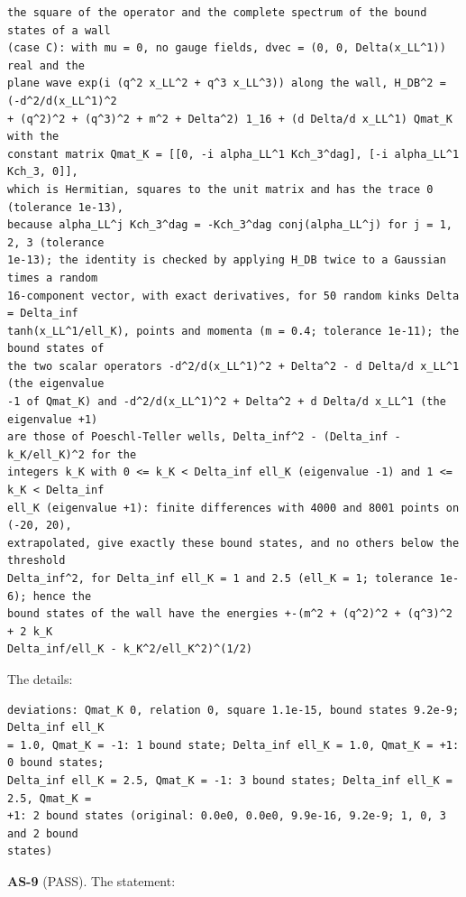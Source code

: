\documentclass[
  10pt,
]{article}
\begin{document}
\begin{verbatim}
the square of the operator and the complete spectrum of the bound states of a wall
(case C): with mu = 0, no gauge fields, dvec = (0, 0, Delta(x_LL^1)) real and the
plane wave exp(i (q^2 x_LL^2 + q^3 x_LL^3)) along the wall, H_DB^2 = (-d^2/d(x_LL^1)^2
+ (q^2)^2 + (q^3)^2 + m^2 + Delta^2) 1_16 + (d Delta/d x_LL^1) Qmat_K with the
constant matrix Qmat_K = [[0, -i alpha_LL^1 Kch_3^dag], [-i alpha_LL^1 Kch_3, 0]],
which is Hermitian, squares to the unit matrix and has the trace 0 (tolerance 1e-13),
because alpha_LL^j Kch_3^dag = -Kch_3^dag conj(alpha_LL^j) for j = 1, 2, 3 (tolerance
1e-13); the identity is checked by applying H_DB twice to a Gaussian times a random
16-component vector, with exact derivatives, for 50 random kinks Delta = Delta_inf
tanh(x_LL^1/ell_K), points and momenta (m = 0.4; tolerance 1e-11); the bound states of
the two scalar operators -d^2/d(x_LL^1)^2 + Delta^2 - d Delta/d x_LL^1 (the eigenvalue
-1 of Qmat_K) and -d^2/d(x_LL^1)^2 + Delta^2 + d Delta/d x_LL^1 (the eigenvalue +1)
are those of Poeschl-Teller wells, Delta_inf^2 - (Delta_inf - k_K/ell_K)^2 for the
integers k_K with 0 <= k_K < Delta_inf ell_K (eigenvalue -1) and 1 <= k_K < Delta_inf
ell_K (eigenvalue +1): finite differences with 4000 and 8001 points on (-20, 20),
extrapolated, give exactly these bound states, and no others below the threshold
Delta_inf^2, for Delta_inf ell_K = 1 and 2.5 (ell_K = 1; tolerance 1e-6); hence the
bound states of the wall have the energies +-(m^2 + (q^2)^2 + (q^3)^2 + 2 k_K
Delta_inf/ell_K - k_K^2/ell_K^2)^(1/2)
\end{verbatim}

The details:

\begin{verbatim}
deviations: Qmat_K 0, relation 0, square 1.1e-15, bound states 9.2e-9; Delta_inf ell_K
= 1.0, Qmat_K = -1: 1 bound state; Delta_inf ell_K = 1.0, Qmat_K = +1: 0 bound states;
Delta_inf ell_K = 2.5, Qmat_K = -1: 3 bound states; Delta_inf ell_K = 2.5, Qmat_K =
+1: 2 bound states (original: 0.0e0, 0.0e0, 9.9e-16, 9.2e-9; 1, 0, 3 and 2 bound
states)
\end{verbatim}

\textbf{AS-9} (PASS). The statement:
\end{document}
